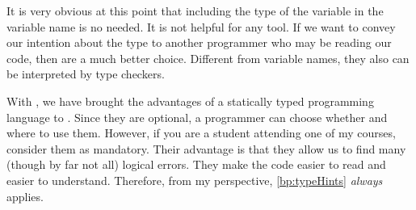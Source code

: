 It is very obvious at this point that including the type of the variable in the variable name is no needed.
It is not helpful for any tool.
If we want to convey our intention about the type to another programmer who may be reading our code, then  are a much better choice.
Different from variable names, they also can be interpreted by type checkers.

With , we have brought the advantages of a statically typed programming language to \python.
Since they are optional, a programmer can choose whether and where to use them.
However, if you are a student attending one of my courses, consider them as mandatory.
Their advantage is that they allow us to find many (though by far not all) logical errors.
They make the code easier to read and easier to understand.
Therefore, from my perspective, \cref{bp:typeHints} \emph{always} applies.%
%
\FloatBarrier%
\endhsection%
%
\endhsection%
%
